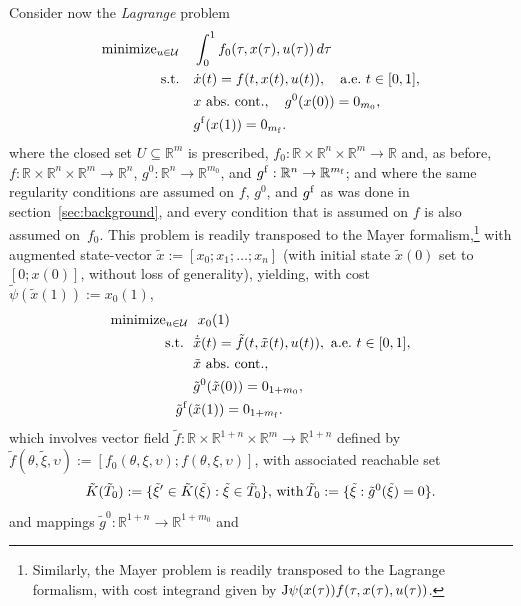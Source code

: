 \documentclass[letterpaper,10pt,conference]{ieeeconf}
\def\R{{\mathbb{R}}}
\begin{document}
Consider now the {\em Lagrange} problem
\begin{equation}
\begin{aligned}
\text{minimize}_{u\in\mathcal U}\quad
&\int_0^1 f_0(\tau,x(\tau),u(\tau))\,d\tau \\
\text{s.t.}\quad
&\dot x(t)=f(t,x(t),u(t)),\quad {\rm a.e.~}t\in[0,1],\\
&x~{\rm abs.~cont.},\quad g^0(x(0))=0_{m_0},\\
&g^{\rm f}(x(1))=0_{m_{\rm f}}.
\end{aligned}
\label{eq:La1}
\end{equation}
where the closed set $U\subseteq\R^m$ is prescribed, 
$f_0:\R\times\R^n\times\R^m\to\R$ and, as before,
$f:\R\times\R^n\times\R^m\to\R^n$, $g^0:\R^n\to\R^{m_0}$, and
$g^{\rm f}:\R^n\to\R^{m_{\rm f}}$; and
where the same regularity conditions are assumed on $f$, $g^0$, and $g^{\rm f}$
as was done in section~\ref{sec:background}, and 
every condition that is assumed on $f$ is also assumed on~$f_0$.
This problem is readily transposed to the Mayer formalism,\footnote{Similarly,
the Mayer problem is readily transposed to the Lagrange formalism, with cost
integrand given by ${\rm J}\psi(x(\tau))f(\tau,x(\tau),u(\tau))$.}
with augmented state-vector $\tilde x:=[x_0;x_1;\ldots;x_n]$
(with initial state $\tilde x(0)$ set to $[0;x(0)]$, without loss of
generality), yielding, with cost $\tilde\psi(\tilde x(1)):=x_0(1)$,
\begin{equation}
\begin{aligned}
\text{minimize}_{u\in\mathcal U}&\ ~x_0(1) \\
\text{s.t.~}&\ \dot{\tilde x}(t)=\tilde f(t,\tilde x(t),u(t)),{\rm~a.e.~}t\in[0,1],\\
&\ \tilde x~{\rm abs.~cont.},\\
&\ \tilde g^0(\tilde x(0))=0_{1+m_0},\\
&\ \hspace{-1.25em}\tilde g^{\rm f}(\tilde x(1))=0_{1+m_{\rm f}}.
\end{aligned}
\label{eq:La2}
\end{equation}
which involves vector field $\tilde f:\R\times\R^{1+n}\times\R^m\to\R^{1+n}$ defined by 
$\tilde f(\theta,\tilde\xi,\upsilon):=[f_0(\theta,\xi,\upsilon);f(\theta,\xi,\upsilon)]$, 
with associated reachable set 
{\small
\[
\tilde K(\tilde T_0):=\{\tilde\xi'\in\tilde K(\tilde\xi):\tilde\xi\in\tilde T_0\},\,{\rm with}\,
\tilde T_0:=\{\tilde\xi:\tilde g^0(\tilde\xi)=0\}.
\]
}
and mappings $\tilde g^0:\R^{1+n}\to\R^{1+m_0}$ and\linebreak
\end{document}
